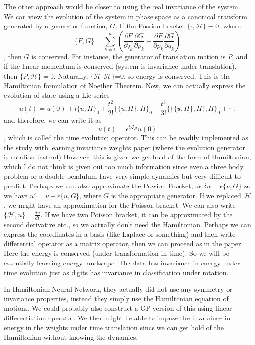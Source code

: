 \documentclass{article}
\begin{document}
The other approach would be closer to using the real invariance of the system.
We can view the evolution of the system in phase space as a canonical transform generated by a generator function, $G$.
If the Possion bracket $\{\cdot,\mathcal{H}\}=0$, where 
$$
\{F, G\}=\sum_{k=1}^{n}\left(\frac{\partial F}{\partial q_{k}} \frac{\partial G}{\partial p_{k}}-\frac{\partial F}{\partial p_{k}} \frac{\partial G}{\partial q_{k}}\right)
$$, 
then $G$ is conserved.  
For instance, the generator of translation motion is $P$, and if the linear momentum is conserved (system is invariance under translation), then $\{P, \mathcal{H}\}=0$.
Naturally, $\{\mathcal{H}, \mathcal{H}\}$=0, so energy is conserved. 
This is the Hamiltonian formulation of Noether Theorem.
Now, we can actually express the evolution of state using a Lie series
$$
u(t)=u(0)+t\{u, H\}_{0}+\frac{t^{2}}{2 !}\{\{u, H\}, H\}_{0}+\frac{t^{3}}{3 !}\{\{\{u, H\}, H\}, H\}_{0}+\cdots .
$$
and therefore, we can write it as 
$$
u(t)=e^{t \mathcal{L}_{H}} u(0)
$$, 
which is called the time evolution operator. 
This can be readily implemented as the study with learning invariance weights paper (where the evolution generator is rotation instead)
However, this is given we get hold of the form of Hamiltonian, which I do not think is given out too much information since even a three body problem or a double pendulum have very simple dynamics but very difficult to predict. 
Perhaps we can also approximate the Possion Bracket, as $\delta u = \epsilon\{u, G\}$ so we have $u' = u + \epsilon\{u, G\}$, where $G$ is the appropriate generator.
If we replaced $\mathcal{H}$, we might have an approximation for the Poisson bracket. 
We can also write $\{\mathcal{H}, u\} = \frac{du}{dt}$.
If we have two Poisson bracket, it can be approximated by the second derivative etc., so we actually don't need the Hamiltonian.  
Perhaps we can express the coordinates in a basis (like Laplace or something) and then write differential operator as a matrix operator, then we can proceed as in the paper.  
Here the energy is conserved (under transformation in time).
So we will be essentially learning energy landscape.
The data has invariance in energy under time evolution just as digits has invariance in classification under rotation.

In Hamiltonian Neural Network, they actually did not use any symmetry or invariance properties, instead they simply use the Hamiltonian equation of motions. 
We could probably also construct a GP version of this using linear differentiation operator. 
We then might be able to impose the invaraince in energy in the weights under time translation since we can get hold of the Hamiltonian without knowing the dynamics.
\end{document}
